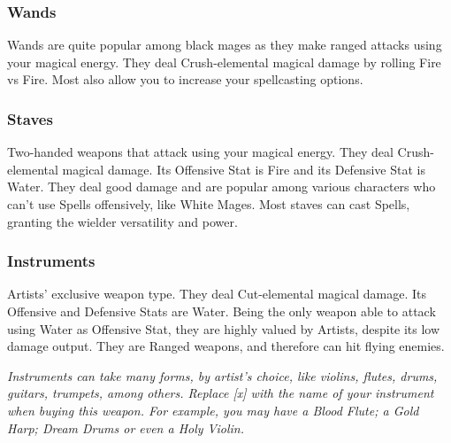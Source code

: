 \begin{tabwpn}[label=inv-rifles-crossbows,range=ranged,type=physical,element=puncture,roll=firevair]
    
\end{tabwpn}
\clearpage

\subsubsection{Wands}

Wands are quite popular among black mages as they make ranged attacks using your magical energy. They deal Crush-elemental magical damage by rolling Fire vs Fire. Most also allow you to increase your spellcasting options.

\begin{tabwpn}[label=inv-wands,range=ranged,type=magical,element=crush,roll=firevfire]
    
\end{tabwpn}
\clearpage

\subsubsection{Staves}

Two-handed weapons that attack using your magical energy. They deal Crush-elemental magical damage. Its Offensive Stat is Fire and its Defensive Stat is Water. They deal good damage and are popular among various characters who can’t use Spells offensively, like White Mages. Most staves can cast Spells, granting the wielder versatility and power.

\begin{tabwpn}[label=inv-staves,range=melee,type=magical,element=crush,roll=firevwater]
    
\end{tabwpn}
\clearpage

\subsubsection{Instruments}

Artists’ exclusive weapon type. They deal Cut-elemental magical damage. Its Offensive and Defensive Stats are Water. Being the only weapon able to attack using Water as Offensive Stat, they are highly valued by Artists, despite its low damage output. They are Ranged weapons, and therefore can hit flying enemies.

\begin{tabwpn}[label=inv-instruments,range=ranged,type=magical,element=cut,roll=watervwater]
    
\end{tabwpn}
{\footnotesize \textit{Instruments can take many forms, by artist’s choice, like violins, flutes, drums, guitars, trumpets, among others. Replace [x] with the name of your instrument when buying this weapon. For example, you may have a Blood Flute; a Gold Harp; Dream Drums or even a Holy Violin.}}
\clearpage

